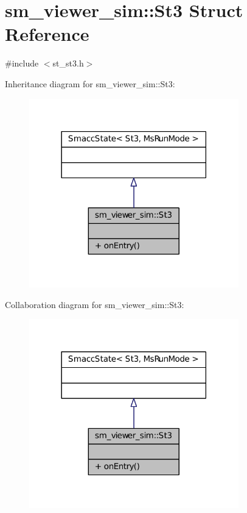 \hypertarget{structsm__viewer__sim_1_1St3}{}\section{sm\+\_\+viewer\+\_\+sim\+:\+:St3 Struct Reference}
\label{structsm__viewer__sim_1_1St3}


{\ttfamily \#include $<$st\+\_\+st3.\+h$>$}



Inheritance diagram for sm\+\_\+viewer\+\_\+sim\+:\+:St3\+:
\nopagebreak
\begin{figure}[H]
\begin{center}
\leavevmode
\includegraphics[width=258pt]{structsm__viewer__sim_1_1St3__inherit__graph}
\end{center}
\end{figure}


Collaboration diagram for sm\+\_\+viewer\+\_\+sim\+:\+:St3\+:
\nopagebreak
\begin{figure}[H]
\begin{center}
\leavevmode
\includegraphics[width=258pt]{structsm__viewer__sim_1_1St3__coll__graph}
\end{center}
\end{figure}
